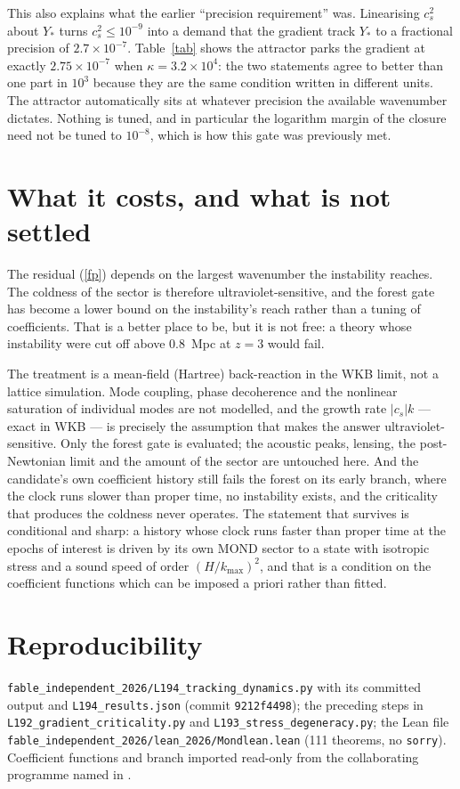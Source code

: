\documentclass[11pt,letterpaper]{article}
\begin{document}
This also explains what the earlier ``precision requirement'' was. Linearising $c_s^2$ about $Y_*$ turns $c_s^2\le10^{-9}$ into a demand that the gradient track $Y_*$ to a fractional precision of $2.7\times10^{-7}$. Table~\ref{tab} shows the attractor parks the gradient at exactly $2.75\times10^{-7}$ when $\kappa=3.2\times10^4$: the two statements agree to better than one part in $10^3$ because they are the same condition written in different units. The attractor automatically sits at whatever precision the available wavenumber dictates. Nothing is tuned, and in particular the logarithm margin of the closure need not be tuned to $10^{-8}$, which is how this gate was previously met.

\section{What it costs, and what is not settled}
The residual (\ref{fp}) depends on the largest wavenumber the instability reaches. The coldness of the sector is therefore ultraviolet-sensitive, and the forest gate has become a lower bound on the instability's reach rather than a tuning of coefficients. That is a better place to be, but it is not free: a theory whose instability were cut off above $0.8$~Mpc at $z=3$ would fail.

The treatment is a mean-field (Hartree) back-reaction in the WKB limit, not a lattice simulation. Mode coupling, phase decoherence and the nonlinear saturation of individual modes are not modelled, and the growth rate $|c_s|k$ --- exact in WKB --- is precisely the assumption that makes the answer ultraviolet-sensitive. Only the forest gate is evaluated; the acoustic peaks, lensing, the post-Newtonian limit and the amount of the sector are untouched here. And the candidate's own coefficient history still fails the forest on its early branch, where the clock runs slower than proper time, no instability exists, and the criticality that produces the coldness never operates. The statement that survives is conditional and sharp: a history whose clock runs faster than proper time at the epochs of interest is driven by its own MOND sector to a state with isotropic stress and a sound speed of order $(H/k_{\max})^2$, and that is a condition on the coefficient functions which can be imposed a priori rather than fitted.

\section{Reproducibility}
\texttt{fable\_independent\_2026/L194\_tracking\_dynamics.py} with its committed output and \texttt{L194\_results.json} (commit \texttt{9212f4498}); the preceding steps in \texttt{L192\_gradient\_criticality.py} and \texttt{L193\_stress\_degeneracy.py}; the Lean file \texttt{fable\_independent\_2026/lean\_2026/Mondlean.lean} (111 theorems, no \texttt{sorry}). Coefficient functions and branch imported read-only from the collaborating programme named in \cite{paper13}.
\end{document}

